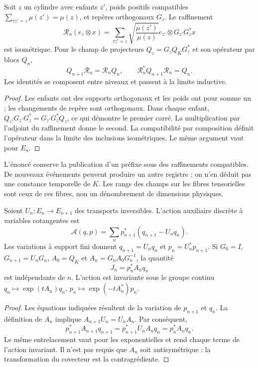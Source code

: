 \begin{proposition}
\label{x_reciprocidad:lib01:refinamiento}
Soit \(z\) un cylindre avec enfants \(z'\), poids positifs compatibles \(\sum_{\tau z'=z}\mu(z')=\mu(z)\), et repères orthogonaux \(G_z\). Le raffinement
\[
 \mathcal R_n(e_z\otimes x)=
 \sum_{\tau z'=z}\sqrt{\frac{\mu(z')}{\mu(z)}}
 e_{z'}\otimes G_{z'}G_z^*x
\]
est isométrique. Pour le champ de projecteurs
\(Q_z=G_zQ_KG_z^*\) et son opérateur par blocs \(Q_n\),
\[
 Q_{n+1}\mathcal R_n=\mathcal R_nQ_n,
 \qquad \mathcal R_n^*Q_{n+1}\mathcal R_n=Q_n.
\]
Les identités se composent entre niveaux et passent à la limite inductive.
\end{proposition}
\begin{proof}
Les enfants ont des supports orthogonaux et les poids ont pour somme un ; les changements de repère sont orthogonaux. Dans chaque enfant, \(Q_{z'}G_{z'}G_z^*=G_{z'}G_z^*Q_z\), ce qui démontre le premier carré. La multiplication par l'adjoint du raffinement donne le second. La compatibilité par composition définit l'opérateur dans la limite des inclusions isométriques. Le même argument vaut pour \(E_u\).
\end{proof}

L’énoncé conserve la publication d’un préfixe sous des raffinements
compatibles. De nouveaux événements peuvent produire un autre registre ; on n’en déduit pas
une constance temporelle de \(K\). Les rangs des champs sur les fibres
tensorielles sont ceux de ces fibres, non un dénombrement de dimensions physiques.

\begin{proposition}
\label{x_reciprocidad:lib01:carga-noether}
Soient \(U_n:E_n\to E_{n+1}\) des transports inversibles. L’action
auxiliaire discrète à variables cotangentes est
\[
 \mathcal A(q,p)=\sum_n p_{n+1}^*(q_{n+1}-U_nq_n).
\]
Les variations à support fini donnent
\(q_{n+1}=U_nq_n\) et \(p_n=U_n^*p_{n+1}\). Si
\(G_0=I\), \(G_{n+1}=U_nG_n\), \(A_0=Q_K\) et
\(A_n=G_nA_0G_n^{-1}\), la quantité
\[
 J_n=p_n^*A_nq_n
\]
est indépendante de \(n\). L'action est invariante sous le groupe continu \(q_n\mapsto\exp(tA_n)q_n\), \(p_n\mapsto\exp(-tA_n^*)p_n\).
\end{proposition}
\begin{proof}
Les équations indiquées résultent de la variation de \(p_{n+1}\) et \(q_n\).
La définition de \(A_n\) implique
\(A_{n+1}U_n=U_nA_n\). Par conséquent,
\[
 p_{n+1}^*A_{n+1}q_{n+1}
 =p_{n+1}^*U_nA_nq_n=p_n^*A_nq_n.
\]
Le même entrelacement vaut pour les exponentielles et rend chaque terme de l'action invariant. Il n'est pas requis que \(A_n\) soit antisymétrique : la transformation du covecteur est la contragrédiente.
\end{proof}

